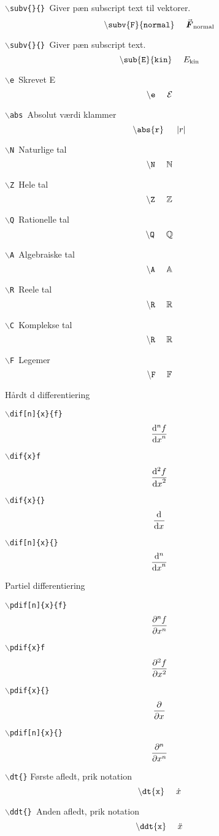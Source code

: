\documentclass[a4paper,hidelinks,11pt]{memoir}
\begin{document}
\mainmatter

\texttt{$\backslash$subv\{\}\{\} }Giver pæn subscript text til vektorer.
$$
\mathtt{\backslash subv\{F\}\{normal\}}~~~~\subv{F}{normal}
$$


\texttt{$\backslash$subv\{\}\{\} }Giver pæn subscript text.
$$
\mathtt{\backslash sub\{E\}\{kin\}}~~~~\sub{E}{kin}
$$



\texttt{$\backslash$e }Skrevet E
$$
\mathtt{\backslash e}~~~~\e
$$

\texttt{$\backslash$abs }Absolut værdi klammer
$$
\mathtt{\backslash abs\{r\}}~~~~\abs{r}
$$

\texttt{$\backslash$N }Naturlige tal
$$
\mathtt{\backslash N}~~~~\N
$$

\texttt{$\backslash$Z }Hele tal
$$
\mathtt{\backslash Z}~~~~\Z
$$

\texttt{$\backslash$Q }Rationelle tal
$$
\mathtt{\backslash Q}~~~~\Q
$$

\texttt{$\backslash$A }Algebraiske tal
$$
\mathtt{\backslash A}~~~~\A
$$

\texttt{$\backslash$R }Reele tal
$$
\mathtt{\backslash R}~~~~\R
$$

\texttt{$\backslash$C }Komplekse tal
$$
\mathtt{\backslash R}~~~~\R
$$

\texttt{$\backslash$F }Legemer
$$
\mathtt{\backslash F}~~~~\F
$$


Hårdt d differentiering


\texttt{$\backslash$dif[n]\{x\}\{f\}}
$$
\dif[n]{x}{f}
$$

\texttt{$\backslash$dif\{x\}f}
$$
\dif[2]{x} f
$$

\texttt{$\backslash$dif\{x\}\{\}}
$$
\dif{x}{}
$$

\texttt{$\backslash$dif[n]\{x\}\{\}}
$$
\dif[n]{x}{}
$$

Partiel differentiering

\texttt{$\backslash$pdif[n]\{x\}\{f\}}
$$
\pdif[n]{x}{f}
$$

\texttt{$\backslash$pdif\{x\}f}
$$
\pdif[2]{x} f
$$

\texttt{$\backslash$pdif\{x\}\{\}}
$$
\pdif{x}{}
$$

\texttt{$\backslash$pdif[n]\{x\}\{\}}
$$
\pdif[n]{x}{}
$$

\texttt{$\backslash$dt\{\}} Første afledt, prik notation
$$
\mathtt{\backslash dt \{ x\} }~~~~\dt{x}
$$ 

\texttt{$\backslash$ddt\{\} }Anden afledt, prik notation
$$
\mathtt{\backslash ddt \{ x\} }~~~~\ddt{x}
$$ 
\end{document}
